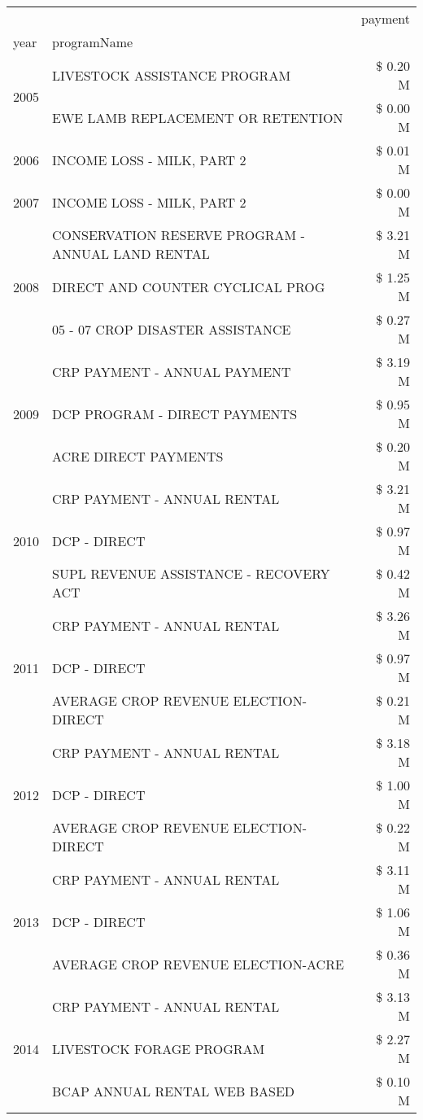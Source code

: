 \begin{tabular}{llr}
\toprule
 &  & payment \\
year & programName &  \\
\midrule
\multirow[t]{2}{*}{2005} & LIVESTOCK ASSISTANCE PROGRAM & \$ 0.20 M \\
 & EWE LAMB REPLACEMENT OR RETENTION & \$ 0.00 M \\
\cline{1-3}
2006 & INCOME LOSS - MILK, PART 2 & \$ 0.01 M \\
\cline{1-3}
2007 & INCOME LOSS - MILK, PART 2 & \$ 0.00 M \\
\cline{1-3}
\multirow[t]{3}{*}{2008} & CONSERVATION RESERVE PROGRAM - ANNUAL LAND RENTAL & \$ 3.21 M \\
 & DIRECT AND COUNTER CYCLICAL PROG & \$ 1.25 M \\
 & 05 - 07 CROP DISASTER ASSISTANCE & \$ 0.27 M \\
\cline{1-3}
\multirow[t]{3}{*}{2009} & CRP PAYMENT - ANNUAL PAYMENT & \$ 3.19 M \\
 & DCP PROGRAM - DIRECT PAYMENTS & \$ 0.95 M \\
 & ACRE DIRECT PAYMENTS & \$ 0.20 M \\
\cline{1-3}
\multirow[t]{3}{*}{2010} & CRP PAYMENT - ANNUAL RENTAL & \$ 3.21 M \\
 & DCP - DIRECT & \$ 0.97 M \\
 & SUPL REVENUE ASSISTANCE - RECOVERY ACT & \$ 0.42 M \\
\cline{1-3}
\multirow[t]{3}{*}{2011} & CRP PAYMENT - ANNUAL RENTAL & \$ 3.26 M \\
 & DCP - DIRECT & \$ 0.97 M \\
 & AVERAGE CROP REVENUE ELECTION-DIRECT & \$ 0.21 M \\
\cline{1-3}
\multirow[t]{3}{*}{2012} & CRP PAYMENT - ANNUAL RENTAL & \$ 3.18 M \\
 & DCP - DIRECT & \$ 1.00 M \\
 & AVERAGE CROP REVENUE ELECTION-DIRECT & \$ 0.22 M \\
\cline{1-3}
\multirow[t]{3}{*}{2013} & CRP PAYMENT - ANNUAL RENTAL & \$ 3.11 M \\
 & DCP - DIRECT & \$ 1.06 M \\
 & AVERAGE CROP REVENUE ELECTION-ACRE & \$ 0.36 M \\
\cline{1-3}
\multirow[t]{3}{*}{2014} & CRP PAYMENT - ANNUAL RENTAL & \$ 3.13 M \\
 & LIVESTOCK FORAGE PROGRAM & \$ 2.27 M \\
 & BCAP ANNUAL RENTAL WEB BASED & \$ 0.10 M \\

\end{tabular}
